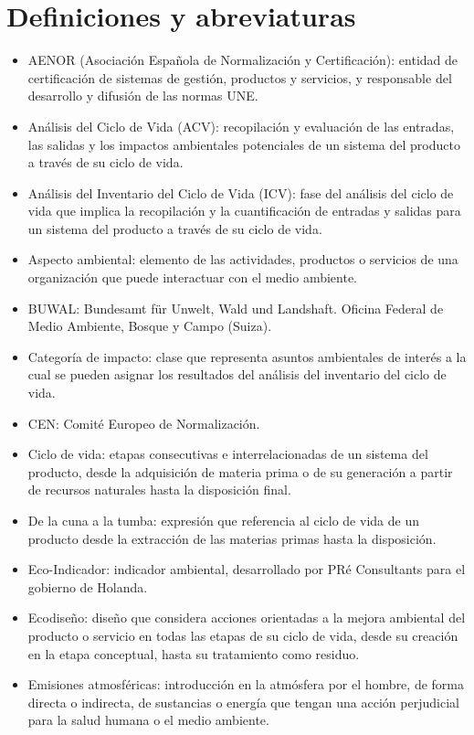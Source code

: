 \chapter{Definiciones y abreviaturas}
\begin{itemize}
  \item AENOR (Asociación Española de Normalización y Certificación): entidad de certificación de sistemas de gestión, productos y servicios, y responsable del desarrollo y difusión de las normas UNE.
  \item Análisis del Ciclo de Vida (ACV): recopilación y evaluación de las entradas, las salidas y los impactos ambientales potenciales de un sistema del producto a través de su ciclo de vida.
  \item Análisis del Inventario del Ciclo de Vida (ICV): fase del análisis del ciclo de vida que implica la recopilación y la cuantificación de entradas y salidas para un sistema del producto a través de su ciclo de vida.
  \item Aspecto ambiental: elemento de las actividades, productos o servicios de una organización que puede interactuar con el medio ambiente.
  \item BUWAL: Bundesamt für Unwelt, Wald und Landshaft. Oficina Federal de Medio Ambiente, Bosque y Campo (Suiza).
  \item Categoría de impacto: clase que representa asuntos ambientales de interés a la cual se pueden asignar los resultados del análisis del inventario del ciclo de vida.
  \item CEN: Comité Europeo de Normalización.
  \item Ciclo de vida: etapas consecutivas e interrelacionadas de un sistema del producto, desde la adquisición de materia prima o de su generación a partir de recursos naturales hasta la disposición final.
  \item De la cuna a la tumba: expresión que referencia al ciclo de vida de un producto desde la extracción de las materias primas hasta la disposición.
  \item Eco-Indicador: indicador ambiental, desarrollado por PRé Consultants para el gobierno de Holanda.
  \item Ecodiseño: diseño que considera acciones orientadas a la mejora ambiental del producto o servicio en todas las etapas de su ciclo de vida, desde su creación en la etapa conceptual, hasta su tratamiento como residuo.
  \item Emisiones atmosféricas: introducción en la atmósfera por el hombre, de forma directa o indirecta, de sustancias o energía que tengan una acción perjudicial para la salud humana o el medio ambiente.

\end{itemize}
